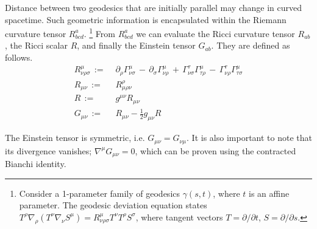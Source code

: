 Distance between two geodesics that are initially parallel may change in curved spacetime. Such geometric information is encapsulated within the Riemann curvature tensor $R^a_{bcd}$. \footnote{Consider a 1-parameter family of geodesics $\gamma(s,t)$, where $t$ is an affine parameter. The geodesic deviation equation states $T^\rho \nabla_\rho ( T^\nu \nabla_\nu S^\mu ) = R^\mu_{\nu\rho\sigma} T^\nu T^\rho S^\sigma$, where tangent vectors $T=\partial/\partial t$, $S=\partial/\partial s$.} From $R^a_{bcd}$ we can evaluate the Ricci curvature tensor $R_{ab}$, the Ricci scalar $R$, and finally the Einstein tensor $G_{ab}$. They are defined as follows.
\begin{align}
	R^\mu_{\nu\rho\sigma} \,:=& \,\, \partial_\rho \Gamma^\mu_{\nu\sigma} \,-\, \partial_\sigma \Gamma^\mu_{\nu\rho} \,+\, \Gamma^\tau_{\nu\sigma} \Gamma^\mu_{\tau\rho} \,-\, \Gamma^\tau_{\nu\rho} \Gamma^\mu_{\tau\sigma}  \label{def:Riemann_tensor}\\
	R_{\mu\nu} \,:=& \,\, R^\rho_{\mu\rho\nu}  \\ %
	R \,:=& \,\, g^{\mu\nu} R_{\mu\nu} \\
	G_{\mu\nu} \,:=& \,\, R_{\mu\nu} - \frac{1}{2} g_{\mu\nu} R \label{def:Einstein_tensor}
\end{align}

The Einstein tensor is symmetric, i.e. $G_{\mu\nu} = G_{\nu\mu}$. It is also important to note that its divergence vanishes; $\nabla^\mu G_{\mu\nu} = 0$, which can be proven using the contracted Bianchi identity.


